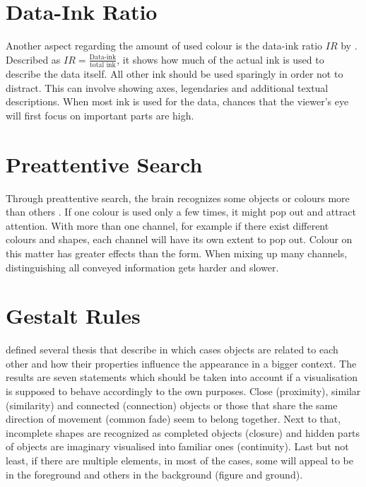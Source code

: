 \section*{Data-Ink Ratio}

Another aspect regarding the amount of used colour is the data-ink ratio $IR$ by \cite{tufte1983}. Described as $IR = \frac{\text{Data-ink}}{\text{total ink}}$, it shows how much of the actual ink is used to describe the data itself. All other ink should be used sparingly in order not to distract. This can involve showing axes, legendaries and additional textual descriptions. When most ink is used for the data, chances that the viewer's eye will first focus on important parts are high.

\section*{Preattentive Search}

Through preattentive search, the brain recognizes some objects or colours more than others \citep{wolfe2005}. If one colour is used only a few times, it might pop out and attract attention. With more than one channel, for example if there exist different colours and shapes, each channel will have its own extent to pop out. Colour on this matter has greater effects than the form. When mixing up many channels, distinguishing all conveyed information gets harder and slower.

\section*{Gestalt Rules}

\cite{wertheimer1923} defined several thesis that describe in which cases objects are related to each other and how their properties influence the appearance in a bigger context. The results are seven statements which should be taken into account if a visualisation is supposed to behave accordingly to the own purposes. Close (proximity), similar (similarity) and connected (connection) objects or those that share the same direction of movement (common fade) seem to belong together. Next to that, incomplete shapes are recognized as completed objects (closure) and hidden parts of objects are imaginary visualised into familiar ones (continuity). Last but not least, if there are multiple elements, in most of the cases, some will appeal to be in the foreground and others in the background (figure and ground)\citep{ali2012}.

